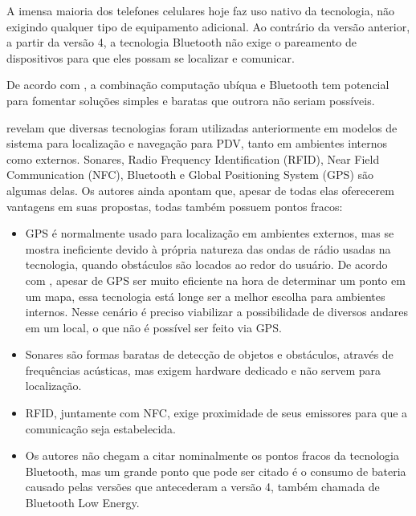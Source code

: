 \documentclass[twoside,english,brazilian]{UNISINOSartigo}
\begin{document}
A imensa maioria dos telefones celulares hoje faz uso nativo da tecnologia, não exigindo qualquer tipo de equipamento adicional. Ao contrário da versão anterior, a partir da versão 4, a tecnologia Bluetooth não exige o pareamento de dispositivos para que eles possam se localizar e comunicar.

De acordo com , a combinação computação ubíqua e Bluetooth tem potencial para fomentar soluções simples e baratas que outrora não seriam possíveis.

 revelam que diversas tecnologias foram utilizadas anteriormente em modelos de sistema para localização e navegação para PDV, tanto em ambientes internos como externos. Sonares, Radio Frequency Identification (RFID), Near Field Communication (NFC), Bluetooth e Global Positioning System (GPS) são algumas delas. Os autores ainda apontam que, apesar de todas elas oferecerem vantagens em suas propostas, todas também possuem pontos fracos:

\begin{itemize}
  \item GPS é normalmente usado para localização em ambientes externos, mas se mostra ineficiente devido à própria natureza das ondas de rádio usadas na tecnologia, quando obstáculos são locados ao redor do usuário. De acordo com , apesar de GPS ser muito eficiente na hora de determinar um ponto em um mapa, essa tecnologia está longe ser a melhor escolha para ambientes internos. Nesse cenário é preciso viabilizar a possibilidade de diversos andares em um local, o que não é possível ser feito via GPS.
  \item Sonares são formas baratas de detecção de objetos e obstáculos, através de frequências acústicas, mas exigem hardware dedicado e não servem para localização.
  \item RFID, juntamente com NFC, exige proximidade de seus emissores para que a comunicação seja estabelecida.
  \item Os autores não chegam a citar nominalmente os pontos fracos da tecnologia Bluetooth, mas um grande ponto que pode ser citado é o consumo de bateria causado pelas versões que antecederam a versão 4, também chamada de Bluetooth Low Energy.
\end{itemize}
\end{document}
